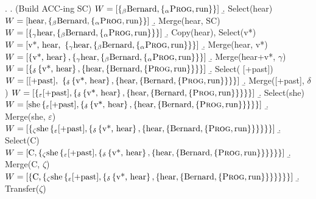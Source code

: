 \documentclass[letterpaper]{article}
\begin{document}
\ex.
\a. (Build ACC-ing SC) \hfill $W = \left[ \left\{_\beta \text{Bernard}, \left\{_\alpha \textsc{Prog}, \text{run} \right\} \right\} \right]$
\b. Select(hear) \hfill $W = \left[\text{hear}, \left\{_\beta \text{Bernard}, \left\{_\alpha \textsc{Prog}, \text{run} \right\} \right\}\right]$
\b. Merge(hear, SC) \hfill $W = \left[\left\{_\gamma \text{hear},  \left\{_\beta \text{Bernard}, \left\{_\alpha \textsc{Prog}, \text{run} \right\} \right\}\right\}\right]$
\b. Copy(hear), Select(v*) \hfill $W = \left[ \text{v*, hear, }\left\{_\gamma \text{hear},  \left\{_\beta \text{Bernard}, \left\{_\alpha \textsc{Prog}, \text{run} \right\} \right\}\right\}\right]$
\b. Merge(hear, v*) \hfill $W = \left[ \left\{\text{v*, hear}\right\}, \left\{_\gamma \text{hear},  \left\{_\beta \text{Bernard}, \left\{_\alpha \textsc{Prog}, \text{run} \right\} \right\}\right\}\right]$
\b. Merge(hear+v*, $\gamma$) \hfill $W = \left[ \left\{_\delta \left\{\text{v*, hear}\right\}, \left\{\text{hear}, \left\{ \text{Bernard}, \left\{ \textsc{Prog}, \text{run} \right\} \right\} \right\}\right\}\right]$
\b. Select( [+past]) \hfill $W = \left[ \text{[+past], } \left\{_\delta \left\{\text{v*, hear}\right\}, \left\{\text{hear}, \left\{ \text{Bernard}, \left\{ \textsc{Prog}, \text{run} \right\} \right\} \right\}\right\}\right]$
\b. Merge([+past], $\delta$) \hfill $W = \left[ \left\{_\varepsilon \text{[+past]}, \left\{_\delta \left\{\text{v*, hear}\right\}, \left\{\text{hear}, \left\{ \text{Bernard}, \left\{ \textsc{Prog}, \text{run} \right\} \right\} \right\}\right\}\right\}\right]$
\b. Select(she) \hfill $W = \left[\text{she} \left\{_\varepsilon \text{[+past]}, \left\{_\delta \left\{\text{v*, hear}\right\}, \left\{\text{hear}, \left\{ \text{Bernard}, \left\{ \textsc{Prog}, \text{run} \right\} \right\} \right\}\right\}\right\}\right]$
\b. Merge(she, $\varepsilon$) \hfill $W = \left[\left\{_\zeta \text{she} \left\{_\varepsilon \text{[+past]}, \left\{_\delta \left\{\text{v*, hear}\right\}, \left\{\text{hear}, \left\{ \text{Bernard}, \left\{ \textsc{Prog}, \text{run} \right\} \right\} \right\}\right\}\right\}\right\}\right]$
\b. Select(C) \hfill $W = \left[ \text{C,} \left\{_\zeta \text{she} \left\{_\varepsilon \text{[+past]}, \left\{_\delta \left\{\text{v*, hear}\right\}, \left\{\text{hear}, \left\{ \text{Bernard}, \left\{ \textsc{Prog}, \text{run} \right\} \right\} \right\}\right\}\right\}\right\}\right]$
\b. Merge(C, $\zeta$) \hfill $W = \left[\left\{ \text{C,} \left\{_\zeta \text{she} \left\{_\varepsilon \text{[+past]}, \left\{_\delta \left\{\text{v*, hear}\right\}, \left\{\text{hear}, \left\{ \text{Bernard}, \left\{ \textsc{Prog}, \text{run} \right\} \right\} \right\}\right\}\right\}\right\}\right\}\right]$
\b. Transfer($\zeta$)
\end{document}
